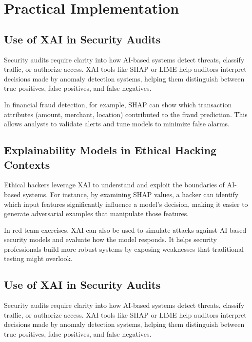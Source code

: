 \documentclass[12pt]{article}
\begin{document}
\section{Practical Implementation}

\subsection{Use of XAI in Security Audits}
Security audits require clarity into how AI-based systems detect threats, classify traffic, or authorize access. XAI tools like SHAP or LIME help auditors interpret decisions made by anomaly detection systems, helping them distinguish between true positives, false positives, and false negatives.


In financial fraud detection, for example, SHAP can show which transaction attributes (amount, merchant, location) contributed to the fraud prediction. This allows analysts to validate alerts and tune models to minimize false alarms.

\subsection{Explainability Models in Ethical Hacking Contexts}
Ethical hackers leverage XAI to understand and exploit the boundaries of AI-based systems. For instance, by examining SHAP values, a hacker can identify which input features significantly influence a model's decision, making it easier to generate adversarial examples that manipulate those features.

In red-team exercises, XAI can also be used to simulate attacks against AI-based security models and evaluate how the model responds. It helps security professionals build more robust systems by exposing weaknesses that traditional testing might overlook.

\subsection{Use of XAI in Security Audits}
Security audits require clarity into how AI-based systems detect threats, classify traffic, or authorize access. XAI tools like SHAP or LIME help auditors interpret decisions made by anomaly detection systems, helping them distinguish between true positives, false positives, and false negatives.
\end{document}
